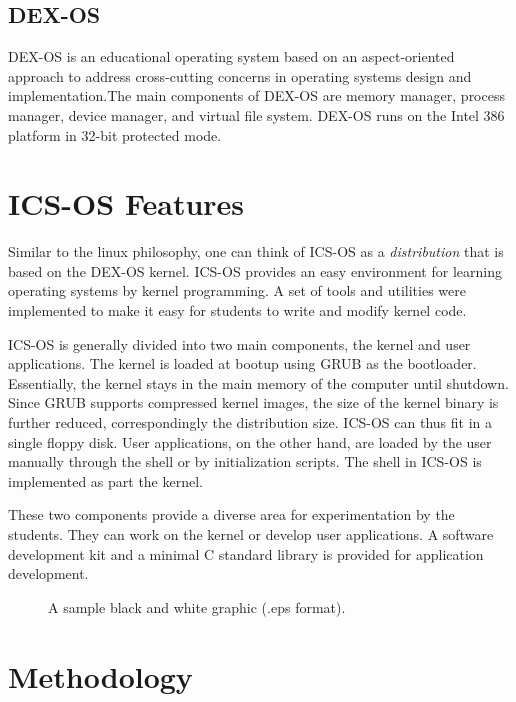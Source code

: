 \documentclass{acm_proc_article-sp}
\begin{document}
\subsection{DEX-OS}
DEX-OS\cite{dayo:dexos,dexos:site} is an educational operating system based on
an aspect-oriented approach to address cross-cutting concerns in operating 
systems design and implementation.The main components of DEX-OS are memory 
manager, process manager, device manager, and virtual file system. DEX-OS runs
on the Intel 386 platform in 32-bit protected mode.

\section{ICS-OS Features}
Similar to the linux philosophy, one can think of ICS-OS as a 
\textit{distribution} that is based on the DEX-OS kernel. ICS-OS provides 
an easy environment for learning operating systems by kernel programming. 
A set of tools and utilities were implemented to make it easy for students
to write and modify kernel code. 

ICS-OS is generally divided into two main components, the kernel and user 
applications. The kernel is loaded at bootup using GRUB as the bootloader. 
Essentially, the kernel stays in the main memory of the computer until shutdown.
Since GRUB supports compressed kernel images, the size of the kernel binary 
is further reduced, correspondingly the distribution size. ICS-OS can thus fit
in a single floppy disk. User applications, on the other hand, are loaded 
by the user manually through the shell or by initialization scripts. The shell
in ICS-OS is implemented as part the kernel.

These two components provide a diverse area for experimentation by the students.
They can work on the kernel or develop user applications. A software 
development kit and a minimal C standard library is provided for application
development. 



\begin{figure}
\centering
{}
\caption{A sample black and white graphic (.eps format).}
\end{figure}



\section{Methodology}
\end{document}
